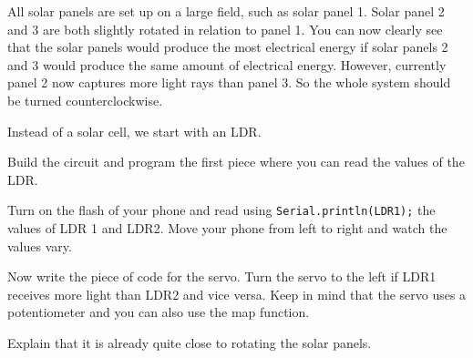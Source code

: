\documentclass{arduino}
\begin{document}
All solar panels are set up on a large field, such as solar panel 1. Solar panel 2 and 3 are both slightly rotated in relation to panel 1. You can now clearly see that the solar panels would produce the most electrical energy if solar panels 2 and 3 would produce the same amount of electrical energy. However, currently panel 2 now captures more light rays than panel 3. So the whole system should be turned counterclockwise.

\newpage

Instead of a solar cell, we start with an LDR.

\begin{alphalist}
\item Build the circuit and program the first piece where you can read the values ​​of the LDR.

\item Turn on the flash of your phone and read using \lstinline{Serial.println(LDR1);} the values ​​of LDR 1 and LDR2. Move your phone from left to right and watch the values ​​vary.

\item Now write the piece of code for the servo. Turn the servo to the left if LDR1 receives more light than LDR2 and vice versa. Keep in mind that the servo uses a potentiometer and you can also use the map function.

\item Explain that it is already quite close to rotating the solar panels.
\end{alphalist}
\end{document}
